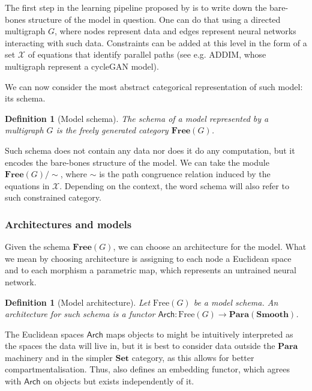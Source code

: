\documentclass[11pt,a4paper,openright,twoside]{report}
\theoremstyle{plain}
\newtheorem{definition}[proposition]{Definition}
\theoremstyle{definition}
\begin{document}
The first step in the learning pipeline proposed by \cite{gavranovic2019compositional} is to write down the bare-bones structure of the model in question. One can do that using a directed multigraph $G$, where nodes represent data and edges represent neural networks interacting with such data. Constraints can be added at this level in the form of a set $\mathcal{X}$ of equations that identify parallel paths (see e.g. ADDIM, whose multigraph represent a cycleGAN model).


We can now consider the most abstract categorical representation of such model: its schema. 

\begin{definition}[Model schema]
  The schema of a model represented by a multigraph $G$ is the freely generated category $\mathbf{Free}(G)$.
\end{definition}

Such schema does not contain any data nor does it do any computation, but it encodes the bare-bones structure of the model. We can take the module $\mathbf{Free}(G)/{\sim}$, where ${\sim}$ is the path congruence relation induced by the equations in $\mathcal{X}$. Depending on the context, the word schema will also refer to such constrained category.

\subsubsection{Architectures and models}


Given the schema $\mathbf{Free}(G)$, we can choose an architecture for the model. What we mean by choosing architecture is assigning to each node a Euclidean space and to each morphism a parametric map, which represents an untrained neural network.

\begin{definition}[Model architecture]
  Let $\mathrm{Free}(G)$ be a model schema. An architecture for such schema is a functor $\mathsf{Arch}: \mathrm{Free}(G) \to \mathbf{Para}(\mathbf{Smooth})$.
\end{definition}

The Euclidean spaces $\mathsf{Arch}$ maps objects to might be intuitively interpreted as the spaces the data will live in, but it is best to consider data outside the $\mathbf{Para}$ machinery and in the simpler $\mathbf{Set}$ category, as this allows for better compartmentalisation. Thus, \cite{gavranovic2019compositional} also defines an embedding functor, which agrees with $\mathsf{Arch}$ on objects but exists independently of it.
\end{document}
